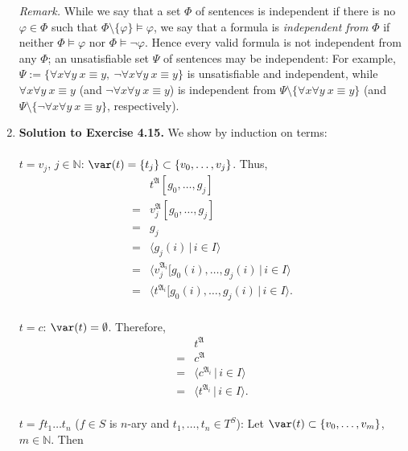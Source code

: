 \begin{enumerate}[1.]
\begin{enumerate}[(i)]
\end{enumerate}
\textit{Remark.} While we say that a set $\Phi$ of sentences is independent if there is no $\varphi \in \Phi$ such that $\Phi \setminus \{ \varphi \} \models \varphi$, we say that a formula is \emph{independent from} $\Phi$ if neither $\Phi \models \varphi$ nor $\Phi \models \neg\varphi$.\cite{Dirk_van_Dalen} Hence every valid formula is not independent from any $\Phi$; an unsatisfiable set $\Psi$ of sentences may be independent: For example, $\Psi := \{ \forall x \forall y \ x \equiv y, \ \neg\forall x \forall y \ x \equiv y \}$ is unsatisfiable and independent, while $\forall x \forall y \ x \equiv y$ (and $\neg\forall x \forall y \ x \equiv y$) is independent from $\Psi \setminus \{ \forall x \forall y \ x \equiv y \}$ (and $\Psi \setminus \{ \neg\forall x \forall y \ x \equiv y \}$, respectively).
%
\item \textbf{Solution to Exercise 4.15.} We show by induction on terms: \\
\ 
\\$t = v_j$, $j \in \mathbb{N}$: $\var(t) = \{ t_j \} \subset \{ v_0, \ldots , v_j \}$. Thus,
\[
\begin{array}{ll}
\,  & t^{\mathfrak{A}} [ g_0, \ldots , g_j ] \\
= & v_j^{\mathfrak{A}} [ g_0, \ldots, g_j ] \\
= & g_j \\
= & \langle g_j (i) \, |\, i \in I \rangle \\
= & \langle v_j^{\mathfrak{A}_i} [ g_0(i), \ldots , g_j(i) \, |\, i \in I \rangle \\
= & \langle t^{\mathfrak{A}_i} [ g_0(i), \ldots , g_j(i) \, |\, i \in I \rangle .
\end{array}
\]
\ 
\\$t = c$: $\var(t) = \emptyset$. Therefore,
\[
\begin{array}{ll}
\,  & t^{\mathfrak{A}} \\
= & c^{\mathfrak{A}} \\
= & \langle c^{\mathfrak{A}_i} \, | \, i \in I \rangle \\
= & \langle t^{\mathfrak{A}_i} \, |\, i \in I \rangle .
\end{array}
\]
\ 
\\$t = ft_1 \ldots t_n$ ($f \in S$ is $n$-ary and $t_1, \ldots , t_n \in T^S$): Let $\var(t) \subset \{ v_0, \ldots , v_m \}$, $m \in \mathbb{N}$. Then

\end{enumerate}
